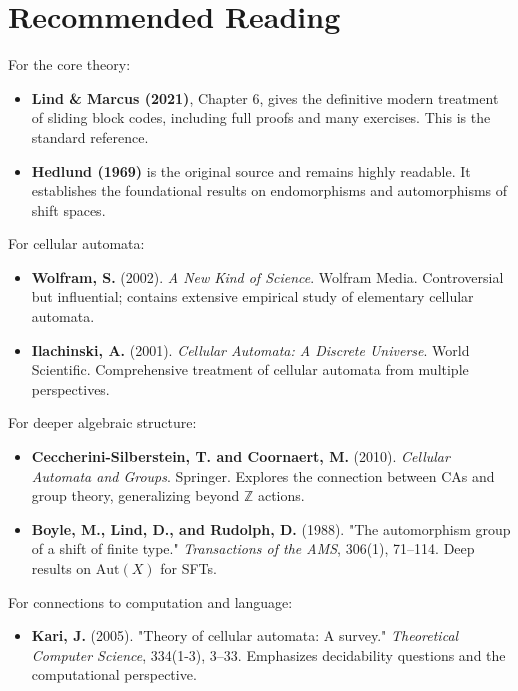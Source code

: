 \section{Recommended Reading}

For the core theory:

\begin{itemize}
\item \textbf{Lind \& Marcus (2021)}, Chapter 6, gives the definitive modern treatment of sliding block codes, including full proofs and many exercises. This is the standard reference.
\end{itemize}

\begin{itemize}
\item \textbf{Hedlund (1969)} is the original source and remains highly readable. It establishes the foundational results on endomorphisms and automorphisms of shift spaces.
\end{itemize}

For cellular automata:

\begin{itemize}
\item \textbf{Wolfram, S.} (2002). \textit{A New Kind of Science}. Wolfram Media. Controversial but influential; contains extensive empirical study of elementary cellular automata.
\end{itemize}

\begin{itemize}
\item \textbf{Ilachinski, A.} (2001). \textit{Cellular Automata: A Discrete Universe}. World Scientific. Comprehensive treatment of cellular automata from multiple perspectives.
\end{itemize}

For deeper algebraic structure:

\begin{itemize}
\item \textbf{Ceccherini-Silberstein, T. and Coornaert, M.} (2010). \textit{Cellular Automata and Groups}. Springer. Explores the connection between CAs and group theory, generalizing beyond $\mathbb{Z}$ actions.
\end{itemize}

\begin{itemize}
\item \textbf{Boyle, M., Lind, D., and Rudolph, D.} (1988). "The automorphism group of a shift of finite type." \textit{Transactions of the AMS}, 306(1), 71--114. Deep results on $\text{Aut}(X)$ for SFTs.
\end{itemize}

For connections to computation and language:

\begin{itemize}
\item \textbf{Kari, J.} (2005). "Theory of cellular automata: A survey." \textit{Theoretical Computer Science}, 334(1-3), 3--33. Emphasizes decidability questions and the computational perspective.
\end{itemize}
